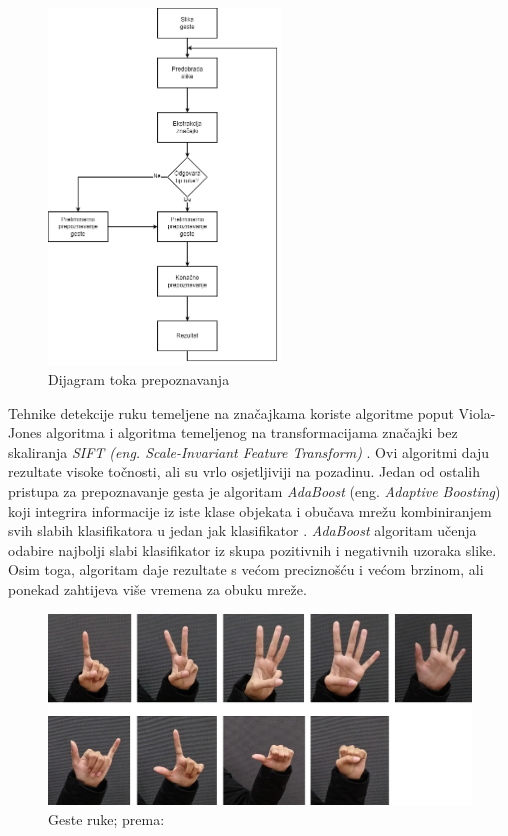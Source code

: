 \documentclass[]{foi} %
\begin{document}
\begin{figure}[!ht]
    \centering
    \includegraphics[width=0.55\textwidth]{slike/graf.png}
    \caption{Dijagram toka prepoznavanja}
    \label{fig:graf}
\end{figure}

\newpage
Tehnike detekcije ruku temeljene na značajkama koriste algoritme poput Viola-Jones algoritma i algoritma temeljenog na transformacijama značajki bez skaliranja \textit{SIFT (eng. Scale-Invariant Feature Transform)} \cite{hand2}. Ovi algoritmi daju rezultate visoke točnosti, ali su vrlo osjetljiviji na pozadinu. Jedan od ostalih pristupa za prepoznavanje gesta je algoritam \textit{AdaBoost} (eng. \textit{Adaptive Boosting}) koji integrira informacije iz iste klase objekata i obučava mrežu kombiniranjem svih slabih klasifikatora u jedan jak klasifikator \cite{hand1}. \textit{AdaBoost} algoritam učenja odabire najbolji slabi klasifikator iz skupa pozitivnih i negativnih uzoraka slike. Osim toga, algoritam daje rezultate s većom preciznošću i većom brzinom, ali ponekad zahtijeva više vremena za obuku mreže.

\vspace{10mm}
\begin{figure}[!ht]
    \centering
    \includegraphics[width=1\textwidth]{slike/geste.png}
    \caption{Geste ruke; prema: \cite{hand4}}
    \label{fig:geste}
\end{figure}
\vspace{10mm}
\end{document}
